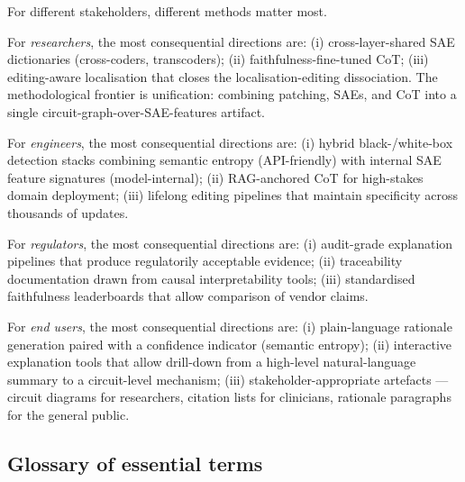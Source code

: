 For different stakeholders, different methods matter most.

For \emph{researchers}, the most consequential directions are: (i) cross-layer-shared SAE dictionaries (cross-coders, transcoders); (ii) faithfulness-fine-tuned CoT; (iii) editing-aware localisation that closes the localisation-editing dissociation. The methodological frontier is unification: combining patching, SAEs, and CoT into a single circuit-graph-over-SAE-features artifact.

For \emph{engineers}, the most consequential directions are: (i) hybrid black-/white-box detection stacks combining semantic entropy (API-friendly) with internal SAE feature signatures (model-internal); (ii) RAG-anchored CoT for high-stakes domain deployment; (iii) lifelong editing pipelines that maintain specificity across thousands of updates.

For \emph{regulators}, the most consequential directions are: (i) audit-grade explanation pipelines that produce regulatorily acceptable evidence; (ii) traceability documentation drawn from causal interpretability tools; (iii) standardised faithfulness leaderboards that allow comparison of vendor claims.

For \emph{end users}, the most consequential directions are: (i) plain-language rationale generation paired with a confidence indicator (semantic entropy); (ii) interactive explanation tools that allow drill-down from a high-level natural-language summary to a circuit-level mechanism; (iii) stakeholder-appropriate artefacts --- circuit diagrams for researchers, citation lists for clinicians, rationale paragraphs for the general public.

\subsection{Glossary of essential terms}\label{glossary-of-essential-terms}

